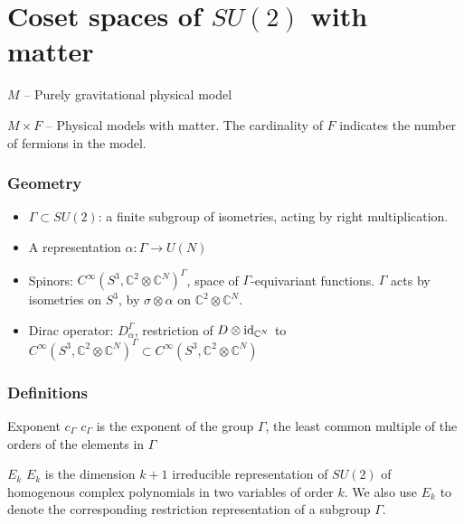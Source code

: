 \documentclass{beamer}
\def\C{{\mathbb C}}
\def\id{{\rm id}}
\begin{document}
\section{Coset spaces of $SU(2)$ with matter}

\begin{frame}
  \begin{block}{}
    $M$ -- Purely gravitational physical model
  \end{block}

  \begin{block}{}
    $M \times F$ -- Physical models with matter. The cardinality of $F$ indicates the number of fermions in the model.
  \end{block} 
\end{frame}

\begin{frame}
	\frametitle{Geometry}
	\begin{itemize}
	\item $\Gamma \subset SU(2)$: a finite subgroup of isometries, acting by right multiplication.
	
	\item A representation $\alpha : \Gamma \rightarrow U(N)$
	
	\item Spinors: $C^{\infty}(S^3,\C^2 \otimes \C^N)^{\Gamma}$, space of $\Gamma$-equivariant functions. $\Gamma$ acts by isometries on $S^3$, by $\sigma \otimes \alpha$ on $\C^2 \otimes \C ^N$.
	
	\item Dirac operator: $D_{\alpha}^{\Gamma}$, restriction of $D\otimes \id_{\C ^N}$ to $C^{\infty}(S^3,\C^2 \otimes \C^N)^{\Gamma} \subset C^{\infty}(S^3,\C^2 \otimes \C^N)$
	\end{itemize}
\end{frame}

\begin{frame}
\frametitle{Definitions}
\begin{block}{Exponent $c_{\Gamma}$}
$c_{\Gamma}$ is the exponent of the group $\Gamma$, the least common multiple of the orders of the elements in $\Gamma$
\end{block}
\begin{block}{$E_k$}
$E_k$ is the dimension $k+1$ irreducible representation of $SU(2)$ of homogenous complex polynomials in two variables of order $k$. We also use $E_k$ to denote the corresponding restriction representation of a subgroup $\Gamma$.
\end{block}
\end{frame}
\end{document}
